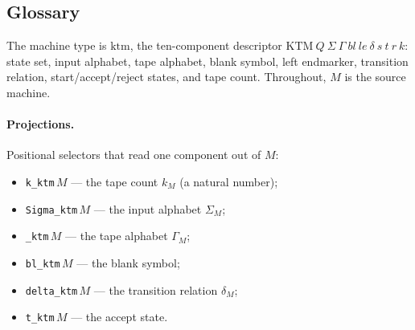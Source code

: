 \subsection{Glossary}

The machine type is $\mathrm{ktm}$, the ten-component descriptor
$\mathrm{KTM}\ Q\ \Sigma\ \Gamma\ bl\ le\ \delta\ s\ t\ r\ k$: state
set, input alphabet, tape alphabet, blank symbol, left endmarker,
transition relation, start/accept/reject states, and tape count.
Throughout, $M$ is the source machine.

\paragraph{Projections.}  Positional selectors that read one component
out of $M$:
\begin{itemize}
\item \texttt{k\_ktm}\,$M$ --- the tape count $k_M$ (a natural number);
\item \texttt{Sigma\_ktm}\,$M$ --- the input alphabet $\Sigma_M$;
\item \texttt{\isasymGamma\_ktm}\,$M$ --- the tape alphabet $\Gamma_M$;
\item \texttt{bl\_ktm}\,$M$ --- the blank symbol;
\item \texttt{delta\_ktm}\,$M$ --- the transition relation $\delta_M$;
\item \texttt{t\_ktm}\,$M$ --- the accept state.
\end{itemize}


